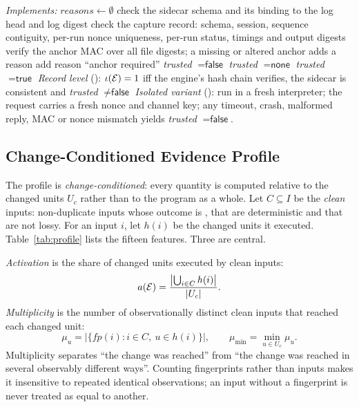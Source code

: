 \begin{algorithm}[!t]
\caption{Integrity validation}
\label{alg:validate}
\small
\begin{algorithmic}[1]
\Statex \textit{Implements:} 
\State $\mathit{reasons}\gets\emptyset$
\State check the sidecar schema and its binding to the log head and log digest
\State check the capture record: schema, session, sequence contiguity, per-run nonce uniqueness, per-run status, timings and output digests
 verify the anchor MAC over all file digests; a missing or altered anchor adds a reason
 add reason ``anchor required''
\EndIf
{} \Return \textit{trusted} $=\textsf{false}$
 \Return \textit{trusted} $=\textsf{none}$ 
\Else{} \Return \textit{trusted} $=\textsf{true}$
\EndIf
\EndFunction
\State \textit{Record level} (): $\iota(\mathcal{E})=1$ iff the engine's hash chain verifies, the sidecar is consistent and \textit{trusted} $\neq\textsf{false}$
\State \textit{Isolated variant} (): run  in a fresh interpreter; the request carries a fresh nonce and channel key; any timeout, crash, malformed reply, MAC or nonce mismatch yields \textit{trusted} $=\textsf{false}$.
\end{algorithmic}
\end{algorithm}

\subsection{Change-Conditioned Evidence Profile}
The profile is \emph{change-conditioned}: every quantity is computed relative to the changed units $U_c$ rather than to the program as a whole. Let $C\subseteq I$ be the \emph{clean} inputs: non-duplicate inputs whose outcome is , that are deterministic and that are not lossy. For an input $i$, let $h(i)$ be the changed units it executed. Table~\ref{tab:profile} lists the fifteen features. Three are central.

\emph{Activation} is the share of changed units executed by clean inputs:
\begin{equation}
a(\mathcal{E})=\frac{\left|\bigcup_{i\in C}h(i)\right|}{|U_c|}.
\label{eq:act}
\end{equation}
\emph{Multiplicity} is the number of observationally distinct clean inputs that reached each changed unit:
\begin{equation}
\mu_u=\left|\{\mathit{fp}(i):i\in C,\ u\in h(i)\}\right|,\qquad\mu_{\min}=\min_{u\in U_c}\mu_u.
\label{eq:mu}
\end{equation}
Multiplicity separates ``the change was reached'' from ``the change was reached in several observably different ways''. Counting fingerprints rather than inputs makes it insensitive to repeated identical observations; an input without a fingerprint is never treated as equal to another.

